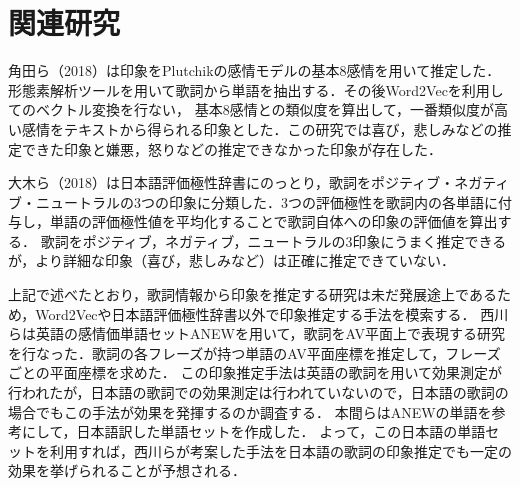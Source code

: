 \documentclass[a4paper,10pt,twocolumn]{jsarticle}
\begin{document}
\section{関連研究}
角田ら（2018）\cite{4}は印象をPlutchikの感情モデルの基本8感情\cite{5}を用いて推定した．形態素解析ツールを用いて歌詞から単語を抽出する．その後Word2Vecを利用してのベクトル変換を行ない，
基本8感情との類似度を算出して，一番類似度が高い感情をテキストから得られる印象とした．この研究では喜び，悲しみなどの推定できた印象と嫌悪，怒りなどの推定できなかった印象が存在した．

大木ら（2018）\cite{6}は日本語評価極性辞書にのっとり，歌詞をポジティブ・ネガティブ・ニュートラルの3つの印象に分類した．3つの評価極性を歌詞内の各単語に付与し，単語の評価極性値を平均化することで歌詞自体への印象の評価値を算出する．
歌詞をポジティブ，ネガティブ，ニュートラルの3印象にうまく推定できるが，より詳細な印象（喜び，悲しみなど）は正確に推定できていない．

上記で述べたとおり，歌詞情報から印象を推定する研究は未だ発展途上であるため，Word2Vecや日本語評価極性辞書以外で印象推定する手法を模索する．
西川らは英語の感情価単語セットANEW\cite{7}を用いて，歌詞をAV平面上で表現する研究を行なった．歌詞の各フレーズが持つ単語のAV平面座標を推定して，フレーズごとの平面座標を求めた．
この印象推定手法は英語の歌詞を用いて効果測定が行われたが，日本語の歌詞での効果測定は行われていないので，日本語の歌詞の場合でもこの手法が効果を発揮するのか調査する．
本間ら\cite{8}はANEWの単語を参考にして，日本語訳した単語セットを作成した．
よって，この日本語の単語セットを利用すれば，西川らが考案した手法を日本語の歌詞の印象推定でも一定の効果を挙げられることが予想される．

%
\end{document}
